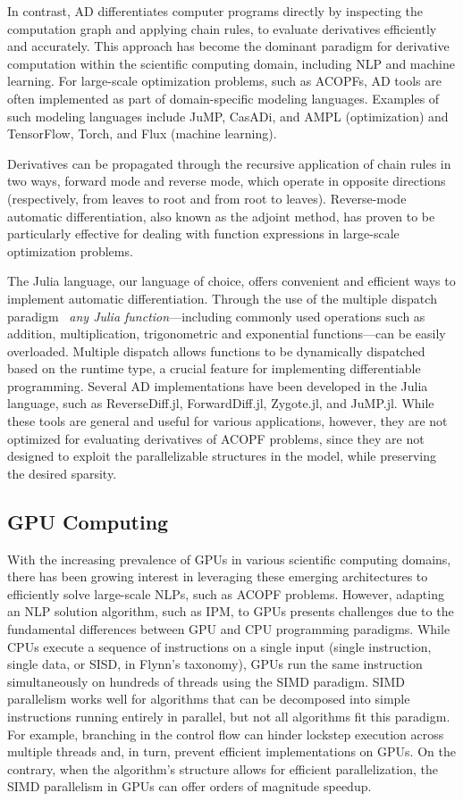 \documentclass{IEEEtran4PSCC} %
\begin{document}
In contrast, AD differentiates computer
programs directly by inspecting the computation graph and applying chain rules,
to evaluate derivatives efficiently and accurately.
This approach has become the dominant paradigm for derivative computation within the
scientific computing domain, including NLP and
machine learning. For large-scale optimization problems, such as ACOPFs, AD tools are often implemented as part of domain-specific
modeling languages. Examples of such modeling languages include JuMP,
CasADi, and AMPL (optimization) and TensorFlow, Torch, and Flux
(machine learning).

 Derivatives can be propagated through the
recursive application of chain rules in two ways, forward mode and 
reverse mode, which operate in opposite directions (respectively, from leaves to
root and from root to leaves). Reverse-mode automatic
differentiation, also known as the adjoint method, has proven to be
particularly effective for dealing with function expressions in
large-scale optimization problems.

The Julia language, our language of choice, offers convenient and
efficient ways to implement automatic differentiation. Through the use
of the multiple dispatch paradigm~\cite{bezanson2017julia} \textit{any
Julia function}---including commonly used operations such as addition,
multiplication, trigonometric and exponential functions---can be easily overloaded. Multiple dispatch allows functions
to be dynamically dispatched based on the runtime type, a crucial
feature for implementing differentiable programming. Several AD
implementations have been developed in the Julia language, such as
ReverseDiff.jl, ForwardDiff.jl, Zygote.jl, and JuMP.jl. While these
tools are general and useful for various applications, however, they are not
optimized for evaluating derivatives of ACOPF problems, since they are
not designed to exploit the parallelizable structures in the model,
while preserving the desired sparsity.


\subsection{GPU Computing}\label{sec:gpu}
With the increasing prevalence of GPUs in various scientific computing
domains, there has been growing interest in leveraging these emerging
architectures to efficiently solve large-scale NLPs, such as ACOPF problems.
However, adapting an NLP solution algorithm,
such as IPM, to GPUs presents challenges due to the fundamental
differences between GPU and CPU programming paradigms. While CPUs
execute a sequence of instructions on a single input (single
instruction, single data, or SISD, in Flynn's taxonomy), GPUs run the
same instruction simultaneously on hundreds of threads using the SIMD
paradigm. SIMD parallelism works well
for algorithms that can be decomposed into simple instructions running
entirely in parallel, but not all algorithms fit this
paradigm. For example, branching in the control flow can hinder
lockstep execution across multiple threads and, in turn, prevent
efficient implementations on GPUs. On the contrary, when the
algorithm's structure allows for efficient parallelization, the SIMD
parallelism in GPUs can offer orders of magnitude speedup.
\end{document}

